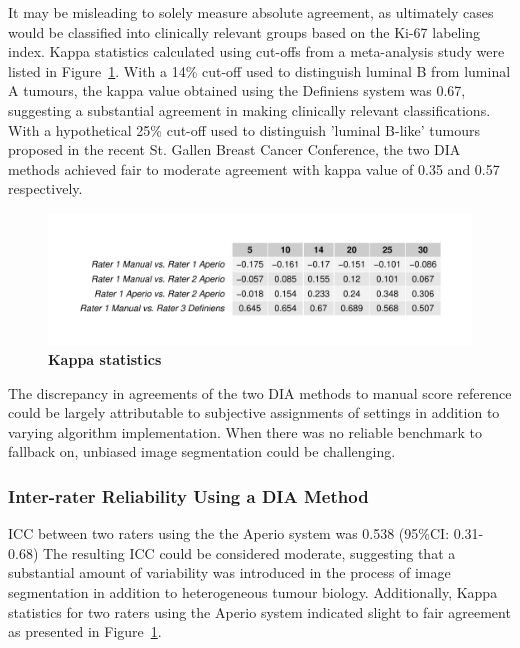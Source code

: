 \documentclass[final,1p,times]{elsarticle}
\begin{document}
It may be misleading to solely measure absolute agreement, as ultimately cases would be classified into clinically relevant groups based on the Ki-67 labeling index. Kappa statistics calculated using cut-offs from a meta-analysis study were listed in Figure~\ref{kappaStat}. \cite{Petrelli2015} With a 14\% cut-off used to distinguish  luminal B from luminal A tumours, \cite{Cheang2009} the kappa value obtained using the Definiens system was 0.67, suggesting a substantial agreement in making clinically relevant classifications. \cite{Landis1977} With a hypothetical 25\% cut-off used to distinguish {'}luminal B-like{'} tumours proposed in the recent St. Gallen Breast Cancer Conference, \cite{Coates2015} the two DIA methods achieved fair to moderate agreement with kappa value of 0.35 and 0.57 respectively.


\begin{figure}
\includegraphics[width = \linewidth]{kappaStat}
\centering
\caption{{\bf Kappa statistics }}
\label{kappaStat}
\end{figure}



The discrepancy in agreements of the two DIA methods to manual score reference could be largely attributable to subjective assignments of settings in addition to varying algorithm implementation. When there was no reliable benchmark to fallback on, unbiased image segmentation could be challenging.

\subsubsection*{Inter-rater Reliability Using a DIA Method}
ICC between two raters using the the Aperio system was 0.538 (95\%CI: 0.31-0.68) The resulting ICC could be considered moderate, suggesting that a substantial amount of variability was introduced in the process of image segmentation in addition to heterogeneous tumour biology. \cite{Cicchetti1994} Additionally, Kappa statistics for two raters using the Aperio system indicated slight to fair agreement as presented in Figure~\ref{kappaStat}. \cite{Landis1977}
\end{document}
